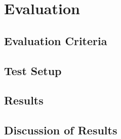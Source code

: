 \chapter{Evaluation}
\label{chap:Evaluation}

\section{Evaluation Criteria}

\section{Test Setup}

\section{Results}

\section{Discussion of Results}
